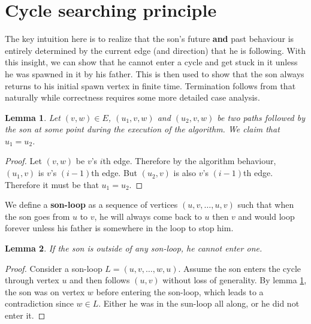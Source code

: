 \documentclass{article}
\newtheorem{lemma}{Lemma}
\newenvironment{definition}[1][Definition.]{\begin{trivlist}
\item[\hskip \labelsep {\bfseries #1}]}{\end{trivlist}}
\begin{document}
\newpage
\section{Cycle searching principle}

The key intuition here is to realize that the son's future \textbf{and} past behaviour is entirely determined by the current edge (and direction) that he is following. With this insight, we can show that he cannot enter a cycle and get stuck in it unless he was spawned in it by his father. This is then used to show that the son always returns to his initial spawn vertex in finite time. Termination follows from that naturally while correctness requires some more detailed case analysis.

\begin{lemma}\label{lemma:deter}
Let $(v,w)\in E$, $(u_1,v,w)$ and $(u_2,v,w)$ be two paths followed by the son at some point during the execution of the algorithm. We claim that $u_1=u_2$.
\end{lemma}
\begin{proof}
Let $(v,w)$ be $v$'s $i$th edge. Therefore by the algorithm behaviour, $(u_1,v)$ is $v$'s $(i-1)$th edge. But $(u_2,v)$ is also $v$'s $(i-1)$th edge. Therefore it must be that $u_1=u_2$.
\end{proof}

\begin{definition}
We define a \textbf{son-loop} as a sequence of vertices $(u,v,\dotsc,u,v)$ such that when the son goes from $u$ to $v$, he will always come back to $u$ then $v$ and would loop forever unless his father is somewhere in the loop to stop him.\end{definition}

\begin{lemma}\label{lemma:sunloop}
If the son is outside of any son-loop, he cannot enter one.
\end{lemma}
\begin{proof}
Consider a son-loop $L=(u,v,\dotsc,w,u)$. Assume the son enters the cycle through vertex $u$ and then follows $(u,v)$ without loss of generality. By lemma \ref{lemma:deter}, the son was on vertex $w$ before entering the son-loop, which leads to a contradiction since $w \in L$. Either he was in the sun-loop all along, or he did not enter it.
\end{proof}
\end{document}
